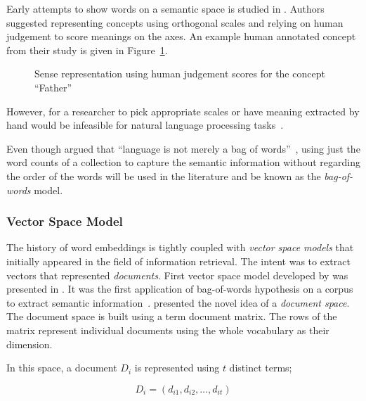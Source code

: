 Early attempts to show words on a semantic space is studied in \textcite{osgood_measurement_1957}.
Authors suggested representing concepts using orthogonal scales and relying on human judgement to score meanings on the axes.
An example human annotated concept from their study is given in Figure~\ref{fig:early_vectors}.

\begin{figure}[htbp]
    \centering
    \caption{Sense representation using human judgement scores for the concept \enquote{Father}~\cite{osgood_measurement_1957}}%
    \label{fig:early_vectors}
\end{figure}

However, for a researcher to pick appropriate scales or have meaning extracted by hand would be infeasible for natural language processing tasks~\cite{lund_producing_1996}.

Even though \citeauthor{harris_distributional_1954} argued that \enquote{language is not merely a bag of words}~\cite{harris_distributional_1954}, using just the word counts of a collection to capture the semantic information without regarding the order of the words will be used in the literature and be known as the \emph{bag-of-words} model.

\subsubsection{Vector Space Model}%
\label{ssub:vector_space_model}

The history of word embeddings is tightly coupled with \emph{vector space models} that initially appeared in the field of information retrieval.
The intent was to extract vectors that represented \emph{documents}.
First vector space model developed by \textcite{salton_vector_1975} was presented in .
It was the first application of bag-of-words hypothesis on a corpus to extract semantic information~\cite{turney_frequency_2010}.
\citeauthor{salton_vector_1975} presented the novel idea of a \emph{document space}.
The document space is built using a term document matrix.
The rows of the matrix represent individual documents using the whole vocabulary as their dimension.

In this space, a document $D_i$ is represented using $t$ distinct terms;

\begin{displaymath}
    D_{i} = (d_{i1}, d_{i2}, \ldots, d_{it})
\end{displaymath}

